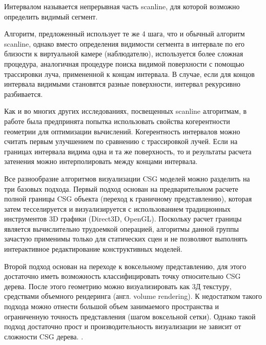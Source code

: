 Интервалом называется непрерывная часть scanline, для которой возможно определить видимый сегмент. 

Алгоритм, предложенный \todo{[atherton1983]} использует те же 4 шага, что и обычный алгоритм scanline, однако вместо определения видимости сегмента в интервале по его близости к виртуальной камере (наблюдателю), используется более сложная процедура, аналогичная процедуре поиска видимой поверхности с помощью трассировки луча, примененной к концам интервала. В случае, если для концов интервала видимыми становятся разные поверхности, интервал рекурсивно разбивается.

Как и во многих других исследованиях, посвещенных scanline алгоритмам, в работе \todo{[atherton1983]} была предпринята попытка использовать свойства когерентности геометрии для оптимизации вычислений. Когерентность интервалов можно считать первым улучшением по сравнению с трассировкой лучей. Если на границах интервала видима одна и та же поверхность, то и результаты расчета затенения можно интерполировать между концами интервала.

Все разнообразие алгоритмов визуализации CSG моделей можно разделить на три базовых подхода. Первый подход основан на предварительном расчете полной границы CSG объекта (переход к граничному представлению), которая затем тесселируется и визуализируется с использованием традиционных инструментов 3D графики (Direct3D, OpenGL). Поскольку расчет границы является  вычислительно трудоемкой операцией, алгоритмы данной группы зачастую применимы только для статических сцен и не позволяют выполнять интерактивное редактирование конструктивных моделей.

Второй подход основан на переходе к воксельному представлению, для этого достаточно иметь возможность классифицировать точку относительно CSG дерева. После этого геометрию можно визуализировать как 3Д текстуру, средствами объемного рендеринга (англ. volume rendering). К недостатком такого подхода можно отнести большой объем занимаемого пространства и ограниченную точность представления (шагом воксельной сетки). Однако такой подход достаточно прост и производительность визуализации не зависит от сложности CSG дерева. .

